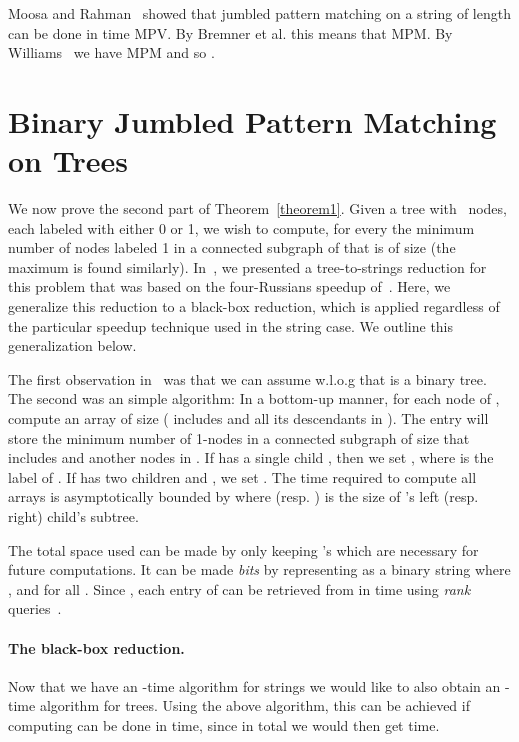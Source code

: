 \documentclass[11pt]{llncs}
\begin{document}
Moosa and Rahman~\cite{MR10} showed that jumbled pattern matching on a string of length   can be done in time MPV. By Bremner et al. this means that MPM. By
Williams~\cite{Ryan} we have MPM and so .




\section{Binary Jumbled Pattern Matching on Trees}

We now prove the second part of Theorem~\ref{theorem1}. Given a tree  with~ nodes, each labeled with either 0 or 1, we wish to compute, for every  the minimum number of nodes labeled 1 in a connected subgraph of  that is of size  (the maximum is found similarly). In~\cite{OurESA13}, we presented a tree-to-strings reduction for this problem that was based on the four-Russians speedup of~\cite{MR12}. Here, we generalize this reduction to a black-box reduction, which is applied regardless of the particular speedup technique used in the string case. We outline this generalization below.

The first observation in~\cite{OurESA13} was that we can assume w.l.o.g that  is a binary tree. The second was an  simple algorithm: In a bottom-up manner, for each node  of , compute an array  of size  ( includes  and all its descendants in ). The entry  will store the minimum number of 1-nodes in a connected subgraph of size  that includes  and another  nodes in . If  has a single child , then we set , where  is the label of . If  has two children  and ,  we set . The time required to compute all arrays is asymptotically bounded by  where  (resp. ) is the size of 's left (resp. right) child's subtree.

The total space used can be made  by only keeping 's which are necessary for future computations. It can be made  {\em bits} by representing  as a binary string  where , and  for all . Since , each entry of  can be retrieved from  in  time using {\em rank} queries~\cite{Jacobson}.

\paragraph{\bf The black-box reduction.}

Now that we have an -time algorithm for  strings we would like to also obtain an -time algorithm for trees. Using the above algorithm, this can be achieved if computing  can be done in  time, since in total we would then get  time.
\end{document}
